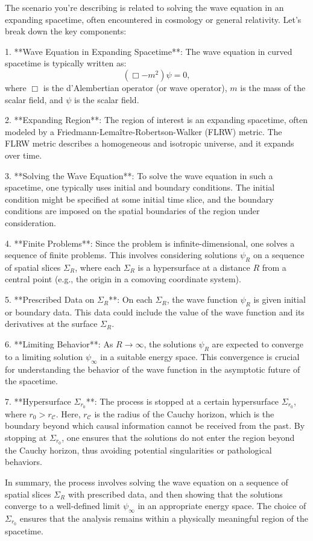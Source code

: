 The scenario you're describing is related to solving the wave equation in an expanding spacetime, often encountered in cosmology or general relativity. Let's break down the key components:

1. **Wave Equation in Expanding Spacetime**:
   The wave equation in curved spacetime is typically written as:
   \[
   (\Box - m^2) \psi = 0,
   \]
   where \(\Box\) is the d'Alembertian operator (or wave operator), \(m\) is the mass of the scalar field, and \(\psi\) is the scalar field.

2. **Expanding Region**:
   The region of interest is an expanding spacetime, often modeled by a Friedmann-Lemaître-Robertson-Walker (FLRW) metric. The FLRW metric describes a homogeneous and isotropic universe, and it expands over time.

3. **Solving the Wave Equation**:
   To solve the wave equation in such a spacetime, one typically uses initial and boundary conditions. The initial condition might be specified at some initial time slice, and the boundary conditions are imposed on the spatial boundaries of the region under consideration.

4. **Finite Problems**:
   Since the problem is infinite-dimensional, one solves a sequence of finite problems. This involves considering solutions \(\psi_R\) on a sequence of spatial slices \(\Sigma_R\), where each \(\Sigma_R\) is a hypersurface at a distance \(R\) from a central point (e.g., the origin in a comoving coordinate system).

5. **Prescribed Data on \(\Sigma_R\)**:
   On each \(\Sigma_R\), the wave function \(\psi_R\) is given initial or boundary data. This data could include the value of the wave function and its derivatives at the surface \(\Sigma_R\).

6. **Limiting Behavior**:
   As \(R \to \infty\), the solutions \(\psi_R\) are expected to converge to a limiting solution \(\psi_\infty\) in a suitable energy space. This convergence is crucial for understanding the behavior of the wave function in the asymptotic future of the spacetime.

7. **Hypersurface \(\Sigma_{r_0}\)**:
   The process is stopped at a certain hypersurface \(\Sigma_{r_0}\), where \(r_0 > r_{\mathcal{C}}\). Here, \(r_{\mathcal{C}}\) is the radius of the Cauchy horizon, which is the boundary beyond which causal information cannot be received from the past. By stopping at \(\Sigma_{r_0}\), one ensures that the solutions do not enter the region beyond the Cauchy horizon, thus avoiding potential singularities or pathological behaviors.

In summary, the process involves solving the wave equation on a sequence of spatial slices \(\Sigma_R\) with prescribed data, and then showing that the solutions converge to a well-defined limit \(\psi_\infty\) in an appropriate energy space. The choice of \(\Sigma_{r_0}\) ensures that the analysis remains within a physically meaningful region of the spacetime.